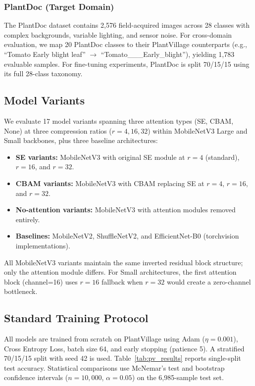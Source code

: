 \documentclass[preprint,12pt]{elsarticle}
\begin{document}
\subsubsection{PlantDoc (Target Domain)}

The PlantDoc dataset \cite{Singh2020} contains 2,576 field-acquired images across 28 classes with complex backgrounds, variable lighting, and sensor noise. For cross-domain evaluation, we map 20 PlantDoc classes to their PlantVillage counterparts (e.g., ``Tomato Early blight leaf'' $\rightarrow$ ``Tomato\_\_\_Early\_blight''), yielding 1,783 evaluable samples. For fine-tuning experiments, PlantDoc is split 70/15/15 using its full 28-class taxonomy.

\subsection{Model Variants}
\label{sec:models}

We evaluate 17 model variants spanning three attention types (SE, CBAM, None) at three compression ratios ($r=4, 16, 32$) within MobileNetV3 Large and Small backbones, plus three baseline architectures:

\begin{itemize}
    \item \textbf{SE variants:} MobileNetV3 with original SE module at $r=4$ (standard), $r=16$, and $r=32$.
    \item \textbf{CBAM variants:} MobileNetV3 with CBAM replacing SE at $r=4$, $r=16$, and $r=32$.
    \item \textbf{No-attention variants:} MobileNetV3 with attention modules removed entirely.
    \item \textbf{Baselines:} MobileNetV2, ShuffleNetV2, and EfficientNet-B0 (torchvision implementations).
\end{itemize}

All MobileNetV3 variants maintain the same inverted residual block structure; only the attention module differs. For Small architectures, the first attention block (channel=16) uses $r=16$ fallback when $r=32$ would create a zero-channel bottleneck.

\subsection{Standard Training Protocol}
\label{sec:pv_training}

All models are trained from scratch on PlantVillage using Adam ($\eta=0.001$), Cross Entropy Loss, batch size 64, and early stopping (patience 5). A stratified 70/15/15 split with seed 42 is used. Table~\ref{tab:pv_results} reports single-split test accuracy. Statistical comparisons use McNemar's test and bootstrap confidence intervals ($n=10{,}000$, $\alpha=0.05$) on the 6,985-sample test set.
\end{document}
